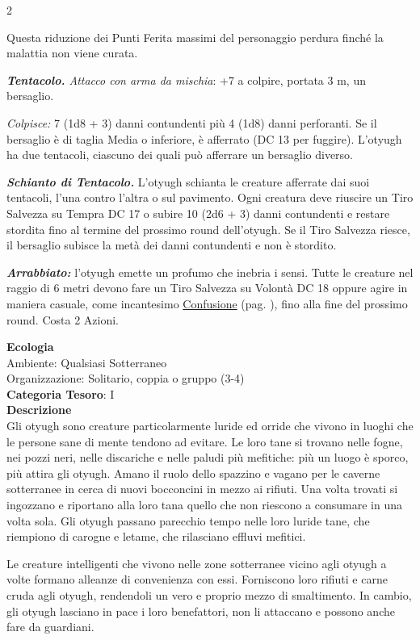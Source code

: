 \begin{multicols}{2}
{Questa riduzione dei Punti Ferita massimi del personaggio perdura finché la malattia non viene curata.

\emph{\textbf{Tentacolo.} Attacco con arma da mischia}: +7 a colpire, portata 3 m, un bersaglio.

\emph{Colpisce:} 7 (1d8 + 3) danni contundenti più 4 (1d8) danni perforanti. Se il bersaglio è di taglia Media o inferiore, è afferrato (DC 13 per fuggire). L'otyugh ha due tentacoli, ciascuno dei quali può afferrare un bersaglio diverso.

\emph{\textbf{Schianto di Tentacolo.}} L'otyugh schianta le creature afferrate dai suoi tentacoli, l'una contro l'altra o sul pavimento. Ogni creatura deve riuscire un Tiro Salvezza su Tempra DC 17 o subire 10 (2d6 + 3) danni contundenti e restare stordita fino al termine del prossimo round dell'otyugh. Se il Tiro Salvezza riesce, il bersaglio subisce la metà dei danni contundenti e non è stordito.

\emph{\textbf{Arrabbiato:}} l'otyugh emette un profumo che inebria i sensi. Tutte le creature nel raggio di 6 metri devono fare un Tiro Salvezza su Volontà DC 18 oppure agire in maniera casuale, come incantesimo \hyperlink{incconfusione}{Confusione} (pag. \pageref{incconfusione}), fino alla fine del prossimo round. Costa 2 Azioni.

\textbf{Ecologia}\\
Ambiente: Qualsiasi Sotterraneo\\
Organizzazione: Solitario, coppia o gruppo (3-4)\\
\textbf{Categoria Tesoro}: I\\
\textbf{Descrizione}\\
Gli otyugh sono creature particolarmente luride ed orride che vivono in luoghi che le persone sane di mente tendono ad evitare. Le loro tane si trovano nelle fogne, nei pozzi neri, nelle discariche e nelle paludi più mefitiche: più un luogo è sporco, più attira gli otyugh. Amano il ruolo dello spazzino e vagano per le caverne sotterranee in cerca di nuovi bocconcini in mezzo ai rifiuti. Una volta trovati si ingozzano e riportano alla loro tana quello che non riescono a consumare in una volta sola. Gli otyugh passano parecchio tempo nelle loro luride tane, che riempiono di carogne e letame, che rilasciano effluvi mefitici.

Le creature intelligenti che vivono nelle zone sotterranee vicino agli otyugh a volte formano alleanze di convenienza con essi. Forniscono loro rifiuti e carne cruda agli otyugh, rendendoli un vero e proprio mezzo di smaltimento. In cambio, gli otyugh lasciano in pace i loro benefattori, non li attaccano e possono anche fare da guardiani.

}
\end{multicols}
